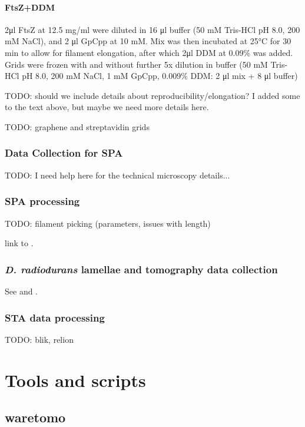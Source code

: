 \paragraph{FtsZ+DDM}
2μl FtsZ at 12.5 mg/ml were diluted in 16 μl buffer (50 mM Tris-HCl pH 8.0, 200 mM NaCl), and 2 μl GpCpp at 10 mM.
Mix was then incubated at 25°C for 30 min to allow for filament elongation, after which 2μl DDM at 0.09\% was added.
Grids were frozen with and without further 5x dilution in buffer (50 mM Tris-HCl pH 8.0, 200 mM NaCl, 1 mM GpCpp, 0.009\% DDM: 2 μl mix + 8 μl buffer)

TODO: should we include details about reproducibility/elongation? I added some to the text above, but maybe we need more details here.

TODO: graphene and streptavidin grids

\subsubsection{Data Collection for SPA}

TODO: I need help here for the technical microscopy details...

\subsubsection{SPA processing}

TODO: filament picking (parameters, issues with length)

link to .

\subsubsection{\textit{D. radiodurans} lamellae and tomography data collection}

See  and .

\subsubsection{STA data processing}

TODO: blik, relion


\section{Tools and scripts}

\subsection{waretomo}\label{waretomo}

